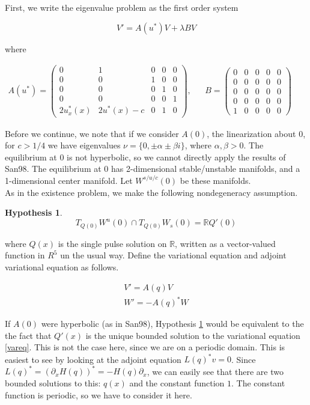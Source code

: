 \documentclass[12pt]{article}
\def\R{{\mathbb R}}
\newtheorem{hypothesis}{Hypothesis}
\begin{document}
First, we write the eigenvalue problem as the first order system

\begin{equation}
V' = A(u^*)V + \lambda B V
\end{equation}

where

\begin{align}
A(u^*) = \begin{pmatrix}0 & 1 & 0 & 0 & 0 \\0 & 0 & 1 & 0 & 0 \\0 & 0 & 0 & 1 & 0 \\0 & 0 & 0 & 0 & 1 \\
2u^*_x(x) & 2u^*(x) - c & 0 & 1 & 0 \end{pmatrix}, &&
B = \begin{pmatrix}0 & 0 & 0 & 0 & 0 \\0 & 0 & 0 & 0 & 0 \\0  & 0 & 0 & 0 & 0 \\0 & 0 & 0 & 0 & 0 \\1 & 0 & 0 & 0 & 0 \end{pmatrix} && 
\end{align}

Before we continue, we note that if we consider $A(0)$, the linearization about 0, for $c > 1/4$ we have eigenvalues $\nu = \{ 0, \pm \alpha \pm \beta i\}$, where $\alpha, \beta > 0$. The equilibrium at 0 is not hyperbolic, so we cannot directly apply the results of San98. The equilibrium at 0 has 2-dimensional stable/unstable manifolds, and a 1-dimensional center manifold. Let $W^{s/u/c}(0)$ be these manifolds.\\

As in the existence problem, we make the following nondegeneracy assumption.

\begin{hypothesis}\label{nondegen}
\[
T_{Q(0)} W^u(0) \cap T_{Q(0)} W_s(0) = \R Q'(0)
\]
\end{hypothesis}

where $Q(x)$ is the single pulse solution on $\R$, written as a vector-valued function in $R^5$ un the usual way. Define the variational equation and adjoint variational equation as follows.

\begin{align}
V' = A(q)V \label{vareq} \\
W' = -A(q)^*W \label{adjvareq}
\end{align}

If $A(0)$ were hyperbolic (as in San98), Hypothesis \ref{nondegen} would be equivalent to the the fact that $Q'(x)$ is the unique bounded solution to the variational equation \eqref{vareq}. This is not the case here, since we are on a periodic domain. This is easiest to see by looking at the adjoint equation $L(q)^* v = 0$. Since $L(q)^* = (\partial_x H(q))^* = -H(q) \partial_x$, we can easily see that there are two bounded solutions to this: $q(x)$ and the constant function $1$. The constant function is periodic, so we have to consider it here.\\
\end{document}

